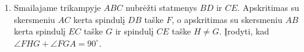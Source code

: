\begin{enumerate}
  \item Smailajame trikampyje $ABC$ nubrėžti statmenys $BD$ ir $CE$.
    Apskritimas su skersmeniu $AC$ kerta spindulį $DB$ taške $F$, o 
    apskritimas su skersmeniu $AB$ kerta spindulį $EC$ taške $G$ ir
    spindulį $CE$ taške $H\neq G$. Įrodyti, kad $\angle FHG+\angle
    FGA=90^\circ$.
\end{enumerate}




